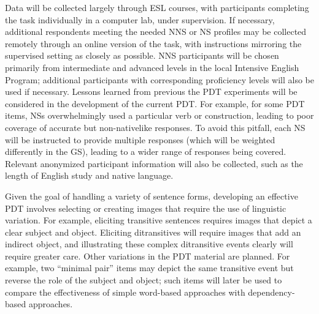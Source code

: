 \par Data will be collected largely through ESL courses, with participants completing the task individually in a computer lab, under supervision. If necessary, additional respondents meeting the needed NNS or NS profiles may be collected remotely through an online version of the task, with instructions mirroring the supervised setting as closely as possible. NNS participants will be chosen primarily from intermediate and advanced levels in the local Intensive English Program; additional participants with corresponding proficiency levels will also be used if necessary. Lessons learned from previous the PDT experiments will be considered in the development of the current PDT. For example, for some PDT items, NSs overwhelmingly used a particular verb or construction, leading to poor coverage of accurate but non-nativelike responses. To avoid this pitfall, each NS will be instructed to provide multiple responses (which will be weighted differently in the GS), leading to a wider range of responses being covered.
Relevant anonymized participant information will also be collected, such as the length of English study and native language.
\par Given the goal of handling a variety of sentence forms, developing an effective PDT involves selecting or creating images that require the use of linguistic variation. For example, eliciting transitive sentences requires images that depict a clear subject and object. Eliciting ditransitives will require images that add an indirect object, and illustrating these complex ditransitive events clearly will require greater care. Other variations in the PDT material are planned. For example, two ``minimal pair'' items may depict the same transitive event but reverse the role of the subject and object; such items will later be used to compare the effectiveness of simple word-based approaches with dependency-based approaches. 
